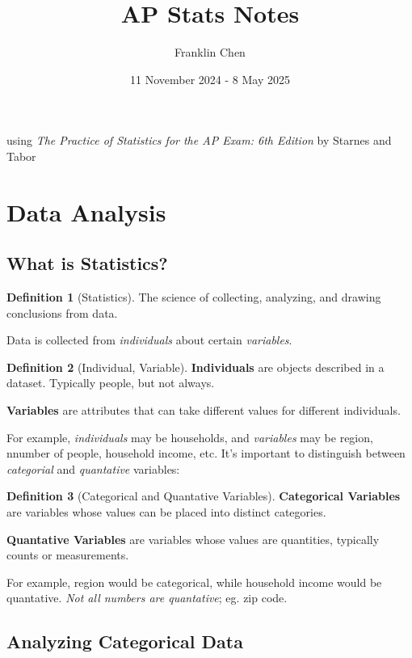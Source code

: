 \documentclass[12pt, a4paper]{article}
\title{AP Stats Notes}
\author{Franklin Chen}
\date{11 November 2024 - 8 May 2025}
\theoremstyle{definition}
\newtheorem{definition}{Definition}
\begin{document}
\maketitle
\newpage

\tableofcontents
\newpage

using \textit{The Practice of Statistics for the AP Exam: 6th Edition} by Starnes and Tabor

\section{Data Analysis}
\subsection{What is Statistics?}

\begin{definition}[Statistics]
    The science of collecting, analyzing, and drawing conclusions from data.
\end{definition}

Data is collected from \emph{individuals} about certain \emph{variables}.

\begin{definition}[Individual, Variable]
    
    \textbf{Individuals} are objects described in a dataset. Typically people, but not always.
    
    \textbf{Variables} are attributes that can take different values for different individuals.
\end{definition}

For example, \emph{individuals} may be households, and \emph{variables} may be region, nnumber of people, household income, etc. It's important to distinguish between \emph{categorial} and \emph{quantative} variables:

\begin{definition}[Categorical and Quantative Variables]
    \textbf{Categorical Variables} are variables whose values can be placed into distinct categories.

    \textbf{Quantative Variables} are variables whose values are quantities, typically counts or measurements.
\end{definition}

For example, region would be categorical, while household income would be quantative. \emph{Not all numbers are quantative}; eg. zip code.

\subsection{Analyzing Categorical Data}
\end{document}
